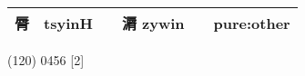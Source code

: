 \documentclass[14pt,a4paper]{scrartcl}
\begin{document}
\begin{longtable}[c]{@{}llllll@{}}
\begin{minipage}[t]{0.14\columnwidth}
脣
\strut\end{minipage} &
\begin{minipage}[t]{0.14\columnwidth}\raggedright\strut
tsyinH
\strut\end{minipage} &
\begin{minipage}[t]{0.14\columnwidth}\raggedright\strut
\strut\end{minipage} &
\begin{minipage}[t]{0.14\columnwidth}\raggedright\strut
漘 zywin
\strut\end{minipage} &
\begin{minipage}[t]{0.14\columnwidth}\raggedright\strut
\strut\end{minipage} &
\begin{minipage}[t]{0.14\columnwidth}\raggedright\strut
pure:other
\strut\end{minipage}\tabularnewline
\bottomrule
\end{longtable}

(120) 0456 {[}2{]}
\end{document}
